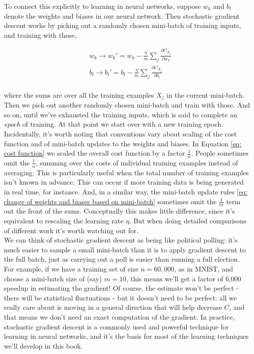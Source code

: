 To connect this explicitly to learning in neural networks, suppose $w_k$ and $b_l$ denote the weights and biases in our neural network. Then stochastic gradient descent works by picking out a randomly chosen mini-batch of training inputs, and training with those,

\begin{equation}
\begin{aligned}
&w_k\rightarrow w_k'=w_k-\frac{\eta}{m}\sum_j\frac{\partial C_{X_j}}{\partial w_k}\\
&b_l\rightarrow b_l'=b_l-\frac{\eta}{m}\sum_j\frac{\partial C_{X_j}}{\partial b_l}\\
\end{aligned}
\label{eq: change of weights and biases based on mini-batch}
\end{equation}

where the sums are over all the training examples $X_j$ in the current mini-batch. Then we pick out another randomly chosen mini-batch and train with those. And so on, until we've exhausted the training inputs, which is said to complete an \textit{epoch} of training. At that point we start over with a new training epoch.\\

Incidentally, it's worth noting that conventions vary about scaling of the cost function and of mini-batch updates to the weights and biases. In Equation \ref{eq: cost function} we scaled the overall cost function by a factor $\frac{1}{n}$. People sometimes omit the $\frac{1}{n}$, summing over the costs of individual training examples instead of averaging. This is particularly useful when the total number of training examples isn't known in advance. This can occur if more training data is being generated in real time, for instance. And, in a similar way, the mini-batch update rules \ref{eq: change of weights and biases based on mini-batch} sometimes omit the $\frac{1}{m}$ term out the front of the sums. Conceptually this makes little difference, since it's equivalent to rescaling the learning rate $\eta$. But when doing detailed comparisons of different work it's worth watching out for.\\

We can think of stochastic gradient descent as being like political polling: it's much easier to sample a small mini-batch than it is to apply gradient descent to the full batch, just as carrying out a poll is easier than running a full election. For example, if we have a training set of size $n=60,000$, as in MNIST, and choose a mini-batch size of (say) $m=10$, this means we'll get a factor of 6,000 speedup in estimating the gradient! Of course, the estimate won't be perfect - there will be statistical fluctuations - but it doesn't need to be perfect: all we really care about is moving in a general direction that will help decrease $C$, and that means we don't need an exact computation of the gradient. In practice, stochastic gradient descent is a commonly used and powerful technique for learning in neural networks, and it's the basis for most of the learning techniques we'll develop in this book.

